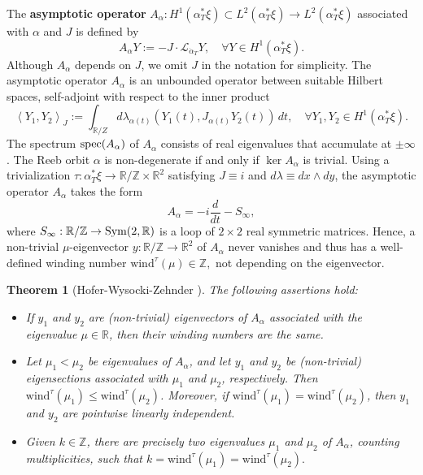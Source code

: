 \documentclass{amsart}
\newcommand{\R}{\mathbb{R}}
\newcommand{\Z}{\mathbb{Z}}
\newtheorem{theorem}{Theorem}[section]
\newcommand{\wind}{\text{wind}^{\tau}}
\begin{document}
The {\bf asymptotic operator}  $A_\alpha:H^1(\alpha_T^*\xi) \subset L^2(\alpha_T^*\xi) \to L^2(\alpha_T^*\xi)$
associated with $\alpha$ and $J$ is defined by
$$A_\alpha Y:=-J\cdot \mathcal{L}_{\dot \alpha_T}Y, \quad \forall Y \in H^1(\alpha_T^*\xi).$$
Although $A_\alpha$ depends on $J$, we omit $J$ in the notation for simplicity. The asymptotic operator $A_\alpha$ is an unbounded operator between suitable Hilbert spaces, self-adjoint with respect to the inner product
$$\left< Y_1,Y_2 \right>_J:=\int_{\R / Z} d\lambda_{\alpha(t)}(Y_1(t),J_{\alpha(t)}Y_2(t) ) \, dt, \quad \forall Y_1,Y_2 \in H^1(\alpha_T^* \xi).$$
The spectrum ${\rm spec}(A_\alpha)$ of $A_\alpha$ consists of real eigenvalues that accumulate at $\pm \infty$. The Reeb orbit $\alpha$ is  non-degenerate  if and only if  $\ker A_\alpha$ is trivial.  
Using a trivialization $\tau:\alpha_T^*\xi \to \R / \Z \times \R^2$ satisfying $J \equiv i$ and $d\lambda \equiv dx \wedge dy$, the asymptotic operator $A_\alpha$ takes the form
\begin{equation}
A_{\alpha} = -i\frac{d}{dt}-S_{\infty}, 
\end{equation}
where $S_{\infty}:\R / \Z \to {\rm Sym}(2,\R)$ is a loop of $2\times 2$ real symmetric matrices. Hence, a non-trivial $\mu$-eigenvector $y:\R / \Z \to \R^2 $ of $A_{\alpha}$ never vanishes and thus has a well-defined winding number $\wind(\mu) \in \Z,$ not depending on the eigenvector.  

\begin{theorem}[Hofer-Wysocki-Zehnder \cite{prop2}] \label{windhwz} The following assertions hold:
\begin{itemize}
\item[(i)] If $y_1$ and $y_2$ are (non-trivial) eigenvectors of $A_{\alpha}$ associated with the eigenvalue $\mu\in \R$, then their winding numbers are the same. 

\item[(ii)] Let  $\mu_1 < \mu_2$ be eigenvalues of $A_\alpha$, and let $y_1$ and $y_2$ be (non-trivial) eigensections associated with $\mu_1$ and $\mu_2$, respectively. Then $\wind(\mu_1) \leq \wind(\mu_2)$. Moreover, if $\wind(\mu_1)=\wind(\mu_2)$, then $y_1$ and $y_2$ are pointwise linearly independent.

\item[(iii)] Given $k \in \Z$, there are precisely two eigenvalues $\mu_1$ and $\mu_2$ of $A_{\alpha}$, counting multiplicities, such that $k=\wind(\mu_1)=\wind(\mu_2).$

\end{itemize}
\end{theorem}
\end{document}
